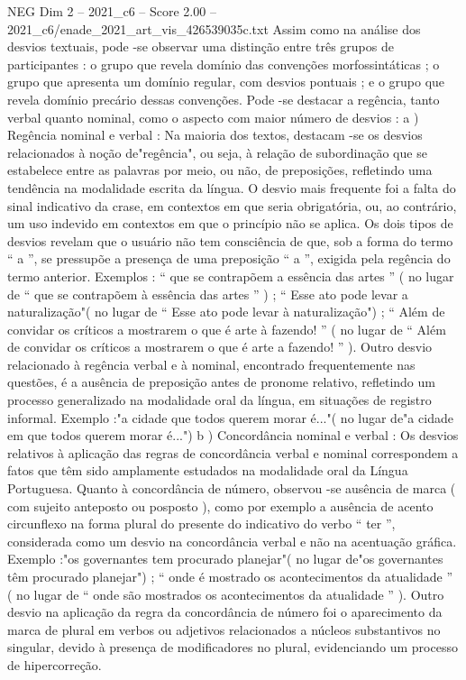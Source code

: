 \begin{textsample}{NEG Dim 2 – 2021\_c6 – Score 2.00 – 2021\_c6/enade\_2021\_art\_vis\_426539035c.txt}
Assim como na análise dos desvios textuais, pode -se observar uma distinção entre três grupos de participantes : o grupo que revela domínio das convenções morfossintáticas ; o grupo que apresenta um domínio regular, com desvios pontuais ; e o grupo que revela domínio precário dessas convenções.
Pode -se destacar a regência, tanto verbal quanto nominal, como o aspecto com maior número de desvios : a ) Regência nominal e verbal : Na maioria dos textos, destacam -se os desvios relacionados à noção de"regência", ou seja, à relação de subordinação que se estabelece entre as palavras por meio, ou não, de preposições, refletindo uma tendência na modalidade escrita da língua.
O desvio mais frequente foi a falta do sinal indicativo da crase, em contextos em que seria obrigatória, ou, ao contrário, um uso indevido em contextos em que o princípio não se aplica.
Os dois tipos de desvios revelam que o usuário não tem consciência de que, sob a forma do termo “ a ”, se pressupõe a presença de uma preposição “ a ”, exigida pela regência do termo anterior.
Exemplos : “ que se contrapõem a essência das artes ” ( no lugar de “ que se contrapõem à essência das artes ” ) ; “ Esse ato pode levar a naturalização"( no lugar de “ Esse ato pode levar à naturalização") ; “ Além de convidar os críticos a mostrarem o que é arte à fazendo! ” ( no lugar de “ Além de convidar os críticos a mostrarem o que é arte a fazendo! ” ).
Outro desvio relacionado à regência verbal e à nominal, encontrado frequentemente nas questões, é a ausência de preposição antes de pronome relativo, refletindo um processo generalizado na modalidade oral da língua, em situações de registro informal.
Exemplo :"a cidade que todos querem morar é..."( no lugar de"a cidade em que todos querem morar é...") b ) Concordância nominal e verbal : Os desvios relativos à aplicação das regras de concordância verbal e nominal correspondem a fatos que têm sido amplamente estudados na modalidade oral da Língua Portuguesa.
Quanto à concordância de número, observou -se ausência de marca ( com sujeito anteposto ou posposto ), como por exemplo a ausência de acento circunflexo na forma plural do presente do indicativo do verbo “ ter ”, considerada como um desvio na concordância verbal e não na acentuação gráfica.
Exemplo :"os governantes tem procurado planejar"( no lugar de"os governantes têm procurado planejar") ; “ onde é mostrado os acontecimentos da atualidade ” ( no lugar de “ onde são mostrados os acontecimentos da atualidade ” ).
Outro desvio na aplicação da regra da concordância de número foi o aparecimento da marca de plural em verbos ou adjetivos relacionados a núcleos substantivos no singular, devido à presença de modificadores no plural, evidenciando um processo de hipercorreção.

\end{textsample}
